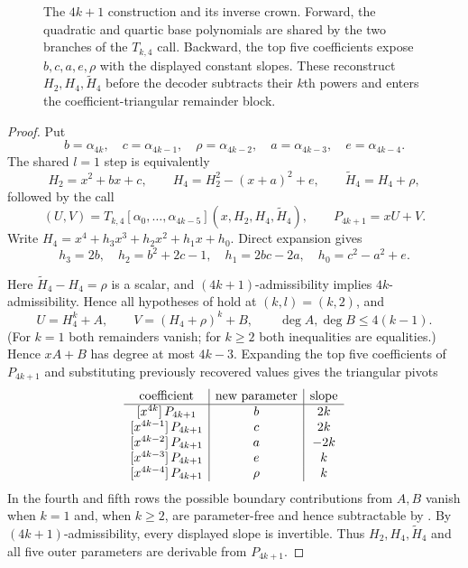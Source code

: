 \begin{figure}[H]
  \centering
  \resizebox{\textwidth}{!}{}
  \caption{The $4k+1$ construction and its inverse crown.  Forward, the
  quadratic and quartic base polynomials are shared by the two branches of the
  $T_{k,4}$ call.  Backward, the top five coefficients expose
  $b,c,a,e,\rho$ with the displayed constant slopes.  These reconstruct
  $H_2,H_4,\widetilde H_4$ before the decoder subtracts their $k$th powers
  and enters the coefficient-triangular remainder block.}
  \label{fig:4k1-crown}
\end{figure}
\begin{proof}
    Put
    \[
      b=\alpha_{4k},\quad c=\alpha_{4k-1},\quad
      \rho=\alpha_{4k-2},\quad a=\alpha_{4k-3},\quad
      e=\alpha_{4k-4}.
    \]
    The shared $l=1$ step is equivalently
    \[
      H_2=x^2+bx+c,\qquad
      H_4=H_2^2-(x+a)^2+e,\qquad
      \tilde H_4=H_4+\rho,
    \]
    followed by the call
    \[
      (U,V)=T_{k,4}[\alpha_0,\ldots,\alpha_{4k-5}]
         (x,H_2,H_4,\tilde H_4),\qquad P_{4k+1}=xU+V.
    \]
    Write $H_4=x^4+h_3x^3+h_2x^2+h_1x+h_0$.  Direct expansion gives
    \[
      h_3=2b,\quad h_2=b^2+2c-1,\quad
      h_1=2bc-2a,\quad h_0=c^2-a^2+e.
    \]

    Here $\tilde H_4-H_4=\rho$ is a scalar, and
    $(4k+1)$-admissibility implies $4k$-admissibility.  Hence all hypotheses
    of  hold at $(k,l)=(k,2)$, and
    \[
      U=H_4^k+A,\qquad V=(H_4+\rho)^k+B,\qquad
      \deg A,\deg B\le4(k-1).
    \]
    (For $k=1$ both remainders vanish; for $k\ge2$ both inequalities are
    equalities.)
    Hence $xA+B$ has degree at most $4k-3$.  Expanding the top five
    coefficients of $P_{4k+1}$ and substituting previously recovered values
    gives the triangular pivots
    \[
    \begin{array}{c|c|c}
      \text{coefficient}&\text{new parameter}&\text{slope}\\ \hline
      \coeff{P_{4k+1}}{4k}&b&2k\\
      \coeff{P_{4k+1}}{4k-1}&c&2k\\
      \coeff{P_{4k+1}}{4k-2}&a&-2k\\
      \coeff{P_{4k+1}}{4k-3}&e&k\\
      \coeff{P_{4k+1}}{4k-4}&\rho&k
    \end{array}
    \]
    In the fourth and fifth rows the possible boundary contributions from
    $A,B$ vanish when $k=1$ and, when $k\ge2$, are parameter-free and hence
    subtractable by .  By
    $(4k+1)$-admissibility, every displayed
    slope is invertible.  Thus $H_2,H_4,\tilde H_4$ and all
    five outer parameters are derivable from $P_{4k+1}$.


\end{proof}
